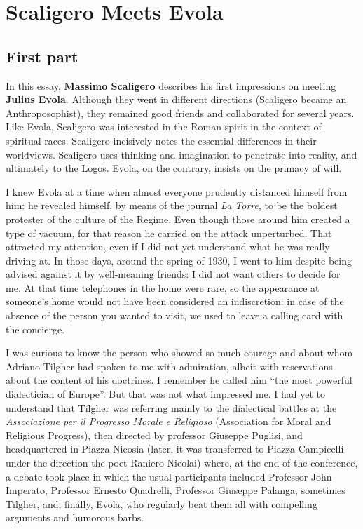 \section{Scaligero Meets Evola}

\subsection*{First part}
\begin{quotex}
In this essay, \textbf{Massimo Scaligero} describes his first impressions on meeting \textbf{Julius Evola}. Although they went in different directions (Scaligero became an Anthroposophist), they remained good friends and collaborated for several years. Like Evola, Scaligero was interested in the Roman spirit in the context of spiritual races. Scaligero incisively notes the essential differences in their worldviews. Scaligero uses thinking and imagination to penetrate into reality, and ultimately to the Logos. Evola, on the contrary, insists on the primacy of will.

\end{quotex}

I knew Evola at a time when almost everyone prudently distanced himself from him: he revealed himself, by means of the journal \emph{La Torre}, to be the boldest protester of the culture of the Regime. Even though those around him created a type of vacuum, for that reason he carried on the attack unperturbed. That attracted my attention, even if I did not yet understand what he was really driving at. In those days, around the spring of 1930, I went to him despite being advised against it by well-meaning friends: I did not want others to decide for me. At that time telephones in the home were rare, so the appearance at someone's home would not have been considered an indiscretion: in case of the absence of the person you wanted to visit, we used to leave a calling card with the concierge.

I was curious to know the person who showed so much courage and about whom Adriano Tilgher had spoken to me with admiration, albeit with reservations about the content of his doctrines. I remember he called him ``the most powerful dialectician of Europe''. But that was not what impressed me. I had yet to understand that Tilgher was referring mainly to the dialectical battles at the \emph{Associazione per il Progresso Morale e Religioso} (Association for Moral and Religious Progress), then directed by professor Giuseppe Puglisi, and headquartered in Piazza Nicosia (later, it was transferred to Piazza Campicelli under the direction the poet Raniero Nicolai) where, at the end of the conference, a debate took place in which the usual participants included Professor John Imperato, Professor Ernesto Quadrelli, Professor Giuseppe Palanga, sometimes Tilgher, and, finally, Evola, who regularly beat them all with compelling arguments and humorous barbs.

